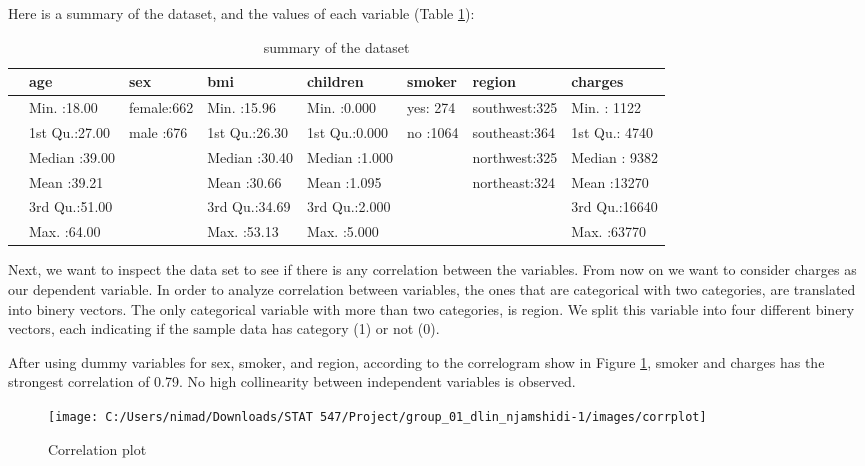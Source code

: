 \documentclass[
]{article}
\begin{document}
Here is a summary of the dataset, and the values of each variable (Table \ref{tab:summary}):

\begin{table}

\caption{\label{tab:summary}summary of the dataset}
\centering
\begin{tabular}[t]{l|l|l|l|l|l|l|l}
\hline
  &      age &     sex &      bmi &    children & smoker &       region &    charges\\
\hline
 & Min.   :18.00 & female:662 & Min.   :15.96 & Min.   :0.000 & yes: 274 & southwest:325 & Min.   : 1122\\
\hline
 & 1st Qu.:27.00 & male  :676 & 1st Qu.:26.30 & 1st Qu.:0.000 & no :1064 & southeast:364 & 1st Qu.: 4740\\
\hline
 & Median :39.00 &  & Median :30.40 & Median :1.000 &  & northwest:325 & Median : 9382\\
\hline
 & Mean   :39.21 &  & Mean   :30.66 & Mean   :1.095 &  & northeast:324 & Mean   :13270\\
\hline
 & 3rd Qu.:51.00 &  & 3rd Qu.:34.69 & 3rd Qu.:2.000 &  &  & 3rd Qu.:16640\\
\hline
 & Max.   :64.00 &  & Max.   :53.13 & Max.   :5.000 &  &  & Max.   :63770\\
\hline
\end{tabular}
\end{table}

Next, we want to inspect the data set to see if there is any correlation between the variables. From now on we want to consider charges as our dependent variable.
In order to analyze correlation between variables, the ones that are categorical with two categories, are translated into binery vectors. The only categorical variable with more than two categories, is region. We split this variable into four different binery vectors, each indicating if the sample data has category (1) or not (0).

After using dummy variables for sex, smoker, and region, according to the correlogram show in Figure \ref{fig:corrplot-png}, smoker and charges has the strongest correlation of 0.79. No high collinearity between independent variables is observed.

\begin{figure}

{\centering \texttt{[image: C:/Users/nimad/Downloads/STAT 547/Project/group\_01\_dlin\_njamshidi-1/images/corrplot]} 

}

\caption{Correlation plot}\label{fig:corrplot-png}
\end{figure}
\end{document}
